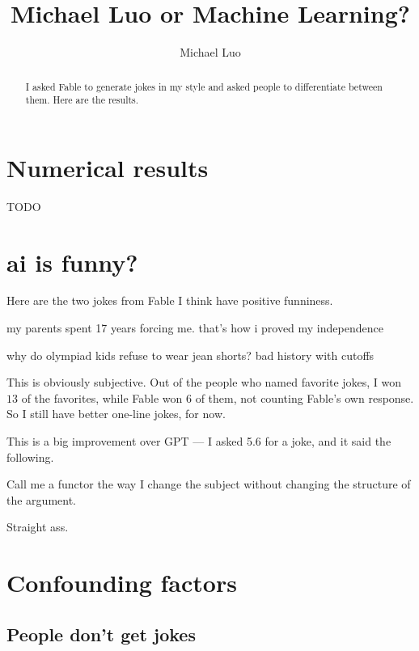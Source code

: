 \documentclass[11pt]{scrartcl}
\title{Michael Luo or Machine Learning?}
\author{Michael Luo}
\begin{document}
\maketitle

\begin{abstract}
    I asked Fable to generate jokes in my style and asked people to differentiate between them. Here are the results.
\end{abstract}

\section{Numerical results}

TODO

\section{ai is funny?}

Here are the two jokes from Fable I think have positive funniness.
\begin{joke}
    my parents spent 17 years forcing me. that's how i proved my independence
\end{joke}
\begin{joke}
    why do olympiad kids refuse to wear jean shorts? bad history with cutoffs
\end{joke}
This is obviously subjective. Out of the people who named favorite jokes, I won $13$ of the favorites, while Fable won $6$ of them, not counting Fable's own response. So I still have better one-line jokes, for now.

This is a big improvement over GPT --- I asked 5.6 for a joke, and it said the following.
\begin{joke}
    Call me a functor the way I change the subject without changing the structure of the argument.
\end{joke}
Straight ass.

\section{Confounding factors}

\subsection{People don't get jokes}
\end{document}
